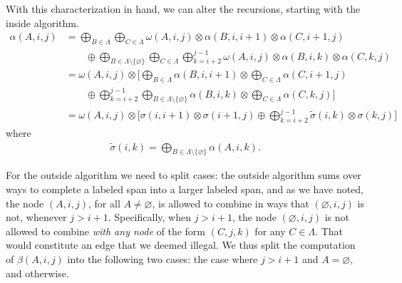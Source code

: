     With this characterization in hand, we can alter the recursions, starting with the inside algorithm.
    \begin{align*}
      \alpha(A, i, j)
        &= \displaystyle\bigoplus_{B \in \Lambda} \displaystyle\bigoplus_{C \in \Lambda} \omega(A, i, j) \otimes \alpha(B,i,i+1) \otimes \alpha(C,i+1,j) \\
          &\qquad\oplus \displaystyle\bigoplus_{B \in \Lambda \setminus \{ \varnothing \} } \displaystyle\bigoplus_{C \in \Lambda} \displaystyle\bigoplus_{k=i+2}^{j-1} \omega(A, i, j) \otimes \alpha(B,i,k) \otimes \alpha(C,k,j) \\
        &= \omega(A, i, j) \otimes  \Bigg[ \displaystyle\bigoplus_{B \in \Lambda}\alpha(B,i,i+1) \otimes  \displaystyle\bigoplus_{C \in \Lambda} \alpha(C,i+1,j)  \\
          &\qquad\oplus \displaystyle\bigoplus_{k=i+2}^{j-1} \displaystyle\bigoplus_{B \in \Lambda \setminus \{ \varnothing \} } \alpha(B,i,k) \otimes \displaystyle\bigoplus_{C \in \Lambda} \alpha(C,k,j)  \Bigg]  \\
        &= \omega(A, i, j) \otimes \Bigg[ \sigma(i,i+1) \otimes \sigma(i+1,j) \oplus \displaystyle\bigoplus_{k=i+2}^{j-1} \tilde{\sigma}(i,k) \otimes \sigma(k,j) \Bigg]
    \end{align*}
    where
    \begin{align*}
      \tilde{\sigma}(i,k) = \displaystyle\bigoplus_{B \in \Lambda \setminus \{ \varnothing \} } \alpha(A, i, k).
    \end{align*}

    For the outside algorithm we need to split cases: the outside algorithm sums over ways to complete a labeled span into a larger labeled span, and as we have noted, the node $(A, i, j)$, for all $A \neq \varnothing$, is allowed to combine in ways that $(\varnothing, i, j)$ is not, whenever $j > i + 1$. Specifically, when $j > i + 1$, the node $(\varnothing, i, j)$ is not allowed to combine \textit{with any node} of the form $(C, j, k)$ for any $C \in \Lambda$. That would constitute an edge that we deemed illegal. We thus split the computation of $\beta(A, i, j)$ into the following two cases: the case where $j > i + 1$ and $ A = \varnothing$, and otherwise.

